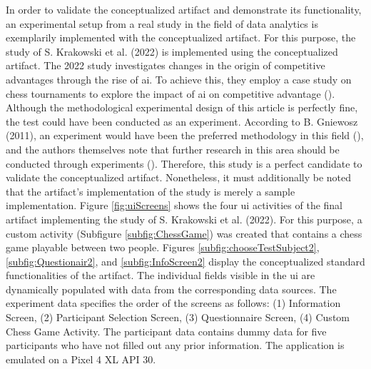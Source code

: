 In order to validate the conceptualized artifact and demonstrate its functionality, an experimental setup from a real study in the field of data analytics is exemplarily implemented with the conceptualized artifact. For this purpose, the study of S. Krakowski et al. (2022) is implemented using the conceptualized artifact. The 2022 study investigates changes in the origin of competitive advantages through the rise of \ac{ai}. To achieve this, they employ a case study on chess tournaments to explore the impact of \ac{ai} on competitive advantage (\cite{Krakowski.2022}). Although the methodological experimental design of this article is perfectly fine, the test could have been conducted as an experiment. According to B. Gniewosz (2011), an experiment would have been the preferred methodology in this field (\cite{Gniewosz.2011}), and the authors themselves note that further research in this area should be conducted through experiments (\cite{Krakowski.2022}). Therefore, this study is a perfect candidate to validate the conceptualized artifact. Nonetheless, it must additionally be noted that the artifact's implementation of the study is merely a sample implementation. Figure \ref{fig:uiScreens} shows the four \ac{ui} activities of the final artifact implementing the study of S. Krakowski et al. (2022). For this purpose, a custom activity (Subfigure \ref{subfig:ChessGame}) was created that contains a chess game playable between two people. Figures \ref{subfig:chooseTestSubject2}, \ref{subfig:Questionair2}, and \ref{subfig:InfoScreen2} display the conceptualized standard functionalities of the artifact. The individual fields visible in the \ac{ui} are dynamically populated with data from the corresponding data sources. The experiment data specifies the order of the screens as follows: (1) Information Screen, (2) Participant Selection Screen, (3) Questionnaire Screen, (4) Custom Chess Game Activity. The participant data contains dummy data for five participants who have not filled out any prior information. The application is emulated on a Pixel 4 XL API 30.


